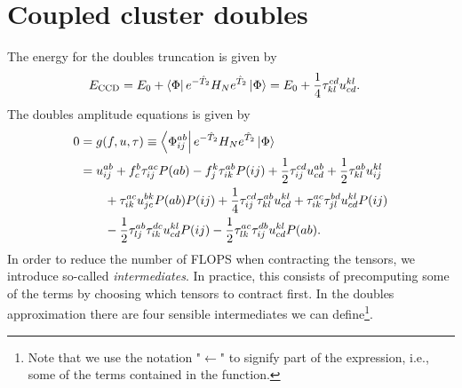     \section{Coupled cluster doubles}
        The energy for the doubles truncation is given by
        \begin{align}
            E_{\text{CCD}}
            &= E_{0}
            + \bra{\Phi} e^{-\hat{T}_2}H_N e^{\hat{T}_2}\ket{\Phi}
            = E_{0}
            + \frac{1}{4}\tau^{cd}_{kl} u^{kl}_{cd}.
        \end{align}
        The doubles amplitude equations is given by\cite{shavitt2009many}
        \begin{align}
            0 &= g(f, u, \tau)
            \equiv \bra{\Phi^{ab}_{ij}}e^{-\hat{T}_2}H_N e^{\hat{T}_2}\ket{\Phi}
            \\
            &=
            u^{ab}_{ij}
            + f^{b}_{c} \tau^{ac}_{ij} P(ab)
            - f^{k}_{j} \tau^{ab}_{ik} P(ij)
            + \frac{1}{2} \tau^{cd}_{ij} u^{ab}_{cd}
            + \frac{1}{2} \tau^{ab}_{kl} u^{kl}_{ij}
            \nonumber \\
            &\qquad
            + \tau^{ac}_{ik} u^{bk}_{jc} P(ab) P(ij)
            + \frac{1}{4} \tau^{cd}_{ij} \tau^{ab}_{kl} u^{kl}_{cd}
            + \tau^{ac}_{ik} \tau^{bd}_{jl} u^{kl}_{cd} P(ij)
            \nonumber \\
            &\qquad
            - \frac{1}{2} \tau^{ab}_{lj} \tau^{dc}_{ik} u^{kl}_{cd} P(ij)
            - \frac{1}{2} \tau^{ac}_{lk} \tau^{db}_{ij} u^{kl}_{cd} P(ab).
        \end{align}
        In order to reduce the number of FLOPS when contracting the tensors, we
        introduce so-called \emph{intermediates}\cite{hjorth2017advanced}. In
        practice, this consists of precomputing some of the terms by choosing
        which tensors to contract first. In the doubles approximation there are
        four sensible intermediates we can define\footnote{Note that we use the
        notation "$\gets$" to signify part of the expression, i.e., some of the
        terms contained in the function.}.
